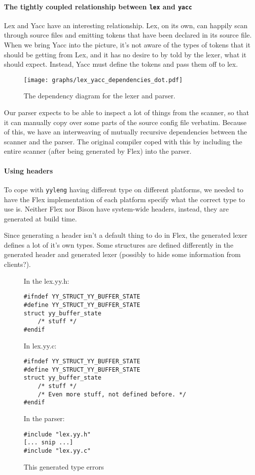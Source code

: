 \documentclass[12pt]{article}
\newcommand{\code}[1]{{\tt #1}}
\begin{document}
\paragraph{The tightly coupled relationship between \code{lex} and \code{yacc}}
Lex and Yacc have an interesting relationship. Lex, on its own, can happily scan
through source files and emitting tokens that have been declared in its source
file. When we bring Yacc into the picture, it's not aware of the types of
tokens that it should be getting from Lex, and it has no desire to by told by
the lexer, what it should expect. Instead, Yacc must define the tokens and pass
them off to lex.

\begin{figure}
\caption{The dependency diagram for the lexer and parser.}
\label{lex-yacc-dependencies}
\texttt{[image: graphs/lex\_yacc\_dependencies\_dot.pdf]}
\end{figure}

Our parser expects to be able to inspect a lot of things from the scanner, so
that it can manually copy over some parts of the source config file verbatim.
Because of this, we have an interweaving of mutually recursive dependencies
between the scanner and the parser. The original compiler coped with this by
including the entire scanner (after being generated by Flex) into the parser.

\paragraph{Using headers}
To cope with \code{yyleng} having different type on different platforms, we
needed to have the Flex implementation of each platform specify what the
correct type to use is. Neither Flex nor Bison have system-wide headers,
instead, they are generated at build time.

Since generating a header isn't a default thing to do in Flex, the generated
lexer defines a lot of it's own types. Some structures are defined differently
in the generated header and generated lexer (possibly to hide some information
from clients?).

\begin{figure}
\label{include-c-h}\caption{This generated type errors}
In the lex.yy.h:
\begin{verbatim}
#ifndef YY_STRUCT_YY_BUFFER_STATE
#define YY_STRUCT_YY_BUFFER_STATE
struct yy_buffer_state
    /* stuff */
#endif
\end{verbatim}

In lex.yy.c:
\begin{verbatim}
#ifndef YY_STRUCT_YY_BUFFER_STATE
#define YY_STRUCT_YY_BUFFER_STATE
struct yy_buffer_state
    /* stuff */
    /* Even more stuff, not defined before. */
#endif
\end{verbatim}

In the parser:
\begin{verbatim}
#include "lex.yy.h"
[... snip ...]
#include "lex.yy.c"
\end{verbatim}
\end{figure}
\end{document}
